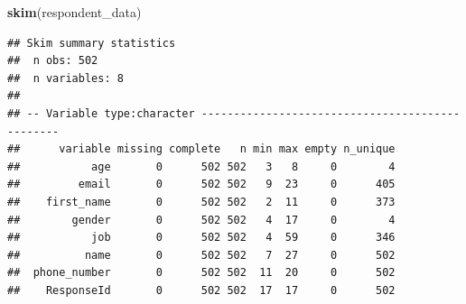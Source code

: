 \documentclass[]{book}
\newenvironment{Shaded}{\begin{snugshade}}{\end{snugshade}}
\newcommand{\KeywordTok}[1]{\textcolor[rgb]{0.13,0.29,0.53}{\textbf{#1}}}
\newcommand{\NormalTok}[1]{#1}
\begin{document}
\begin{Shaded}
\begin{Highlighting}[]
\KeywordTok{skim}\NormalTok{(respondent_data)}
\end{Highlighting}
\end{Shaded}

\begin{verbatim}
## Skim summary statistics
##  n obs: 502 
##  n variables: 8 
## 
## -- Variable type:character ------------------------------------------------
##      variable missing complete   n min max empty n_unique
##           age       0      502 502   3   8     0        4
##         email       0      502 502   9  23     0      405
##    first_name       0      502 502   2  11     0      373
##        gender       0      502 502   4  17     0        4
##           job       0      502 502   4  59     0      346
##          name       0      502 502   7  27     0      502
##  phone_number       0      502 502  11  20     0      502
##    ResponseId       0      502 502  17  17     0      502
\end{verbatim}


\end{document}
